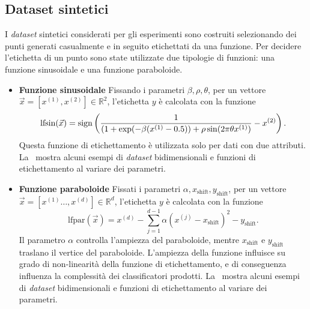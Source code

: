 \subsection{Dataset sintetici}
I \emph{dataset} sintetici considerati per gli esperimenti sono costruiti selezionando dei punti generati casualmente e in seguito etichettati da una funzione.
Per decidere l'etichetta di un punto sono state utilizzate due tipologie di funzioni: una funzione sinusoidale e una funzione paraboloide.
\begin{itemize}
    \item \textbf{Funzione sinusoidale} Fissando i parametri $\beta,\rho,\theta$, per un vettore $\Vec{x}=[x^{(1)},x^{(2)}] \in \mathbb{R}^2$, l'etichetta $y$ è calcolata con la funzione
    \begin{equation}\label{eq:sinusoid_dataset_lf}
    \textrm{lfsin}(\Vec{x}) = \mathrm{sign}\left(\frac{1}{(1 + \exp(-\beta(x^{(1)} - 0.5)) + \rho \sin(2\pi\theta x^{(1)})} - x^{(2)}\right).
    \end{equation}
    Questa funzione di etichettamento è utilizzata solo per dati con due attributi. La~ mostra alcuni esempi di \emph{dataset} bidimensionali e funzioni di etichettamento al variare dei parametri.

    \item \textbf{Funzione paraboloide} Fissati i parametri $\alpha, x_\text{shift}, y_\text{shift}$, per un vettore $\Vec{x}=[x^{(1)}\dots, x^{(d)}] \in \mathbb{R}^d$, l'etichetta $y$ è calcolata con la funzione
    \begin{equation}\label{eq:pacman_dataset_lf}
    \textrm{lfpar}(\Vec{x})= x^{(d)} - \sum_{j=1}^{d-1}\alpha(x^{(j)} - x_\text{shift})^2 - y_\text{shift}.
    \end{equation}
    Il parametro $\alpha$ controlla l'ampiezza del paraboloide, mentre $x_\text{shift}$ e $y_\text{shift}$ traslano il vertice del paraboloide.
    L'ampiezza della funzione influisce su grado di non-linearità della funzione di etichettamento, e di conseguenza influenza la complessità dei classificatori prodotti.
    La~ mostra alcuni esempi di \emph{dataset} bidimensionali e funzioni di etichettamento al variare dei parametri.
\end{itemize}
